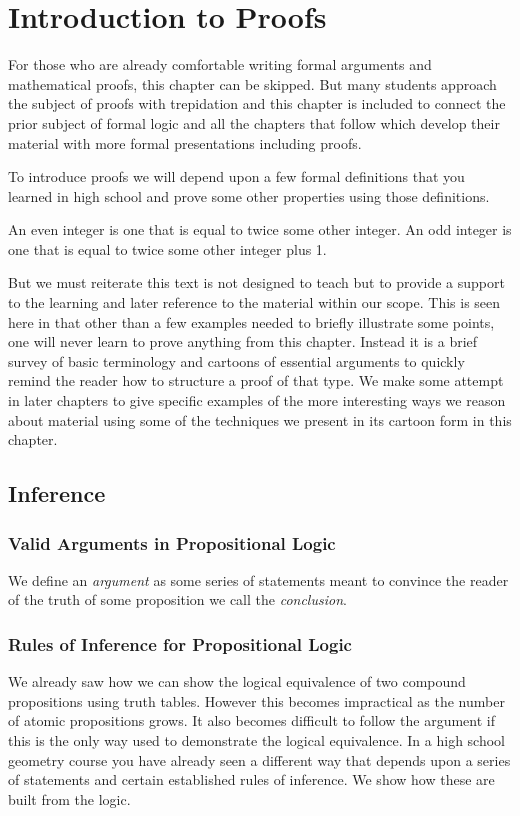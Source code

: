 
\chapter{Introduction to Proofs}
For those who are already comfortable writing formal arguments and mathematical proofs, this chapter can be skipped. But many students approach the subject of proofs with trepidation and this chapter is included to connect the prior subject of formal logic and all the chapters that follow which develop their material with more formal presentations including proofs. 

To introduce proofs we will depend upon a few formal definitions that you learned in high school and prove some other properties using those definitions. 

\begin{definition}
An even integer is one that is equal to twice some other integer. An odd integer is one that is equal to twice some other integer plus 1.
\end{definition}

But we must reiterate this text is not designed to teach but to provide a  support to the learning and later reference to the material within our scope. This is seen here in that other than a few examples needed to briefly illustrate some points, one will never learn to prove anything from this chapter. Instead it is a brief survey of basic terminology and cartoons of essential arguments to quickly remind the reader how to structure a proof of that type. We make some attempt in later chapters to give specific examples of the more interesting ways we reason about material using some of the techniques we present in its cartoon form in this chapter.

\section {Inference}
   \subsection {Valid Arguments in Propositional Logic}
\begin{definition}[Argument]
We define an \textit{argument} as some series of statements meant to convince the reader of the truth of some proposition we call the \textit{conclusion}.
\end{definition}

 
   \subsection {Rules of Inference for Propositional Logic}
We already saw how we can show the logical equivalence of two compound propositions using truth tables. However this becomes impractical as the number of atomic propositions grows. It also becomes difficult to follow the argument if this is the only way used to demonstrate the logical equivalence. In a high school geometry course you have already seen a different way that depends upon a series of statements and certain established rules of inference. We show how these are built from the logic.

